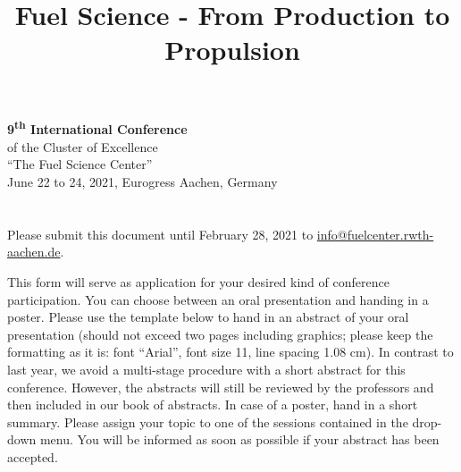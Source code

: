 \documentclass[11pt,a4paper]{article}
\title{\bf Fuel Science - From Production to Propulsion}
\author{}
\date{}
\begin{document}
\maketitle

{
\centering
{\bf 9\textsuperscript{th} International Conference}\\
of the Cluster of Excellence\\
``The Fuel Science Center''\\
June 22 to 24, 2021, Eurogress Aachen, Germany\\}

\section*{}
Please submit this document until February 28, 2021 to \href{info@fuelcenter.rwth-aachen.de}{info@fuelcenter.rwth-aachen.de}.

This form will serve as application for your desired kind of conference participation.
You can choose between an oral presentation and handing in a poster.
Please use the template below to hand in an abstract of your oral presentation (should not exceed two pages including graphics; please keep the formatting as it is: font “Arial”, font size 11, line spacing 1.08 cm).
In contrast to last year, we avoid a multi-stage procedure with a short abstract for this conference.
However, the abstracts will still be reviewed by the professors and then included in our book of abstracts.
In case of a poster, hand in a short summary.
Please assign your topic to one of the sessions contained in the drop-down menu.
You will be informed as soon as possible if your abstract has been accepted.
\end{document}
